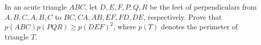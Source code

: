 In an acute triangle $ABC$, let $D, E, F, P, Q, R$ be the feet of perpendiculars from $A, B, C, A, B, C$ to $BC, CA, AB, EF, FD, DE$, respectively. Prove that $p(ABC)p(PQR) \geq p(DEF)^2$, where $p(T)$ denotes the perimeter of triangle $T$.
